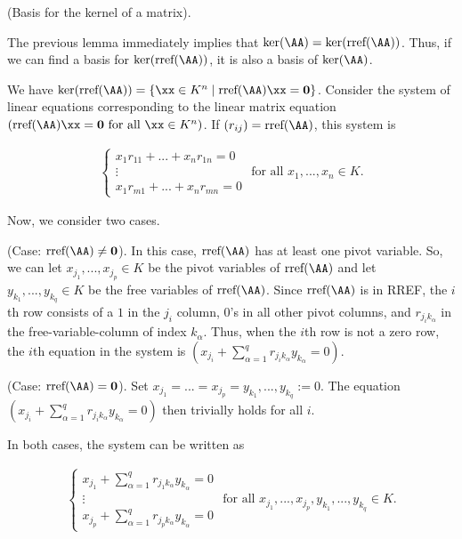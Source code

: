 \begin{deriv}
    (Basis for the kernel of a matrix).

    The previous lemma immediately implies that $\ker(\AA) = \ker(\rref(\AA))$. Thus, if we can find a basis for $\ker(\rref(\AA))$, it is also a basis of $\ker(\AA)$.

    We have $\ker(\rref(\AA)) = \{\xx \in K^n \mid \rref(\AA) \xx = \mathbf{0}\}$. Consider the system of linear equations corresponding to the linear matrix equation $(\rref(\AA) \xx = \mathbf{0} \text{ for all $\xx \in K^n$})$. If $(r_{ij}) = \rref(\AA)$, this system is

    \begin{align*}
        \begin{cases}
            x_1 r_{11} + ... + x_n r_{1n} = 0 \\
            \vdots \\
            x_1 r_{m1} + ... + x_n r_{mn} = 0
        \end{cases}
        \text{ for all $x_1, ..., x_n \in K$}.
    \end{align*}

    Now, we consider two cases.
    
    (Case: $\rref(\AA) \neq \mathbf{0}$). In this case, $\rref(\AA)$ has at least one pivot variable. So, we can let $x_{j_1}, ..., x_{j_p} \in K$ be the pivot variables of $\rref(\AA)$ and let $y_{k_1}, ..., y_{k_q} \in K$ be the free variables of $\rref(\AA)$. Since $\rref(\AA)$ is in RREF, the $i$th row consists of a $1$ in the $j_i$ column, $0$'s in all other pivot columns, and $r_{j_i k_\alpha}$ in the free-variable-column of index $k_\alpha$. Thus, when the $i$th row is not a zero row, the $i$th equation in the system is $(x_{j_i} + \sum_{\alpha = 1}^q r_{j_i k_\alpha} y_{k_\alpha} = 0)$.

    (Case: $\rref(\AA) = \mathbf{0}$). Set $x_{j_1} = ... = x_{j_p} = y_{k_1}, ..., y_{k_q} := 0$. The equation $(x_{j_i} + \sum_{\alpha = 1}^q r_{j_i k_\alpha} y_{k_\alpha} = 0)$ then trivially holds for all $i$.

    In both cases, the system can be written as
    
    \begin{align*}
        \begin{cases}
            x_{j_1} + \sum_{\alpha = 1}^q r_{j_1 k_\alpha} y_{k_\alpha} = 0 \\
            \vdots \\
            x_{j_p} + \sum_{\alpha = 1}^q r_{j_p k_\alpha} y_{k_\alpha} = 0
        \end{cases}
        \text{ for all $x_{j_1}, ..., x_{j_p}, y_{k_1}, ..., y_{k_q} \in K$}.
    \end{align*}


\end{deriv}
